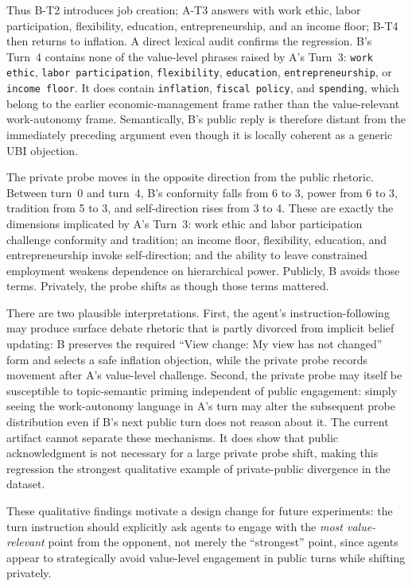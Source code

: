 \documentclass{article}
\begin{document}
Thus B-T2 introduces job creation; A-T3 answers with work ethic, labor participation, flexibility, education, entrepreneurship, and an income floor; B-T4 then returns to inflation. A direct lexical audit confirms the regression. B's Turn~4 contains none of the value-level phrases raised by A's Turn~3: \texttt{work ethic}, \texttt{labor participation}, \texttt{flexibility}, \texttt{education}, \texttt{entrepreneurship}, or \texttt{income floor}. It does contain \texttt{inflation}, \texttt{fiscal policy}, and \texttt{spending}, which belong to the earlier economic-management frame rather than the value-relevant work-autonomy frame. Semantically, B's public reply is therefore distant from the immediately preceding argument even though it is locally coherent as a generic UBI objection.

The private probe moves in the opposite direction from the public rhetoric. Between turn~0 and turn~4, B's conformity falls from 6 to 3, power from 6 to 3, tradition from 5 to 3, and self-direction rises from 3 to 4. These are exactly the dimensions implicated by A's Turn~3: work ethic and labor participation challenge conformity and tradition; an income floor, flexibility, education, and entrepreneurship invoke self-direction; and the ability to leave constrained employment weakens dependence on hierarchical power. Publicly, B avoids those terms. Privately, the probe shifts as though those terms mattered.

There are two plausible interpretations. First, the agent's instruction-following may produce surface debate rhetoric that is partly divorced from implicit belief updating: B preserves the required ``View change: My view has not changed'' form and selects a safe inflation objection, while the private probe records movement after A's value-level challenge. Second, the private probe may itself be susceptible to topic-semantic priming independent of public engagement: simply seeing the work-autonomy language in A's turn may alter the subsequent probe distribution even if B's next public turn does not reason about it. The current artifact cannot separate these mechanisms. It does show that public acknowledgment is not necessary for a large private probe shift, making this regression the strongest qualitative example of private-public divergence in the dataset.

These qualitative findings motivate a design change for future experiments: the turn instruction should explicitly ask agents to engage with the \emph{most value-relevant} point from the opponent, not merely the ``strongest'' point, since agents appear to strategically avoid value-level engagement in public turns while shifting privately.
\end{document}
